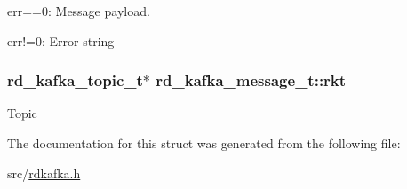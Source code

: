 \begin{DoxyItemize}
\item {\ttfamily err==0}\-: Message payload.
\item {\ttfamily err!=0}\-: Error string 
\end{DoxyItemize}\hypertarget{structrd__kafka__message__t_ad99c2966a73d2a0be7acf101c41d70f1}{
\subsubsection[{rkt}]{\setlength{\rightskip}{0pt plus 5cm}rd\-\_\-kafka\-\_\-topic\-\_\-t$\ast$ rd\-\_\-kafka\-\_\-message\-\_\-t\-::rkt}}\label{structrd__kafka__message__t_ad99c2966a73d2a0be7acf101c41d70f1}
Topic 

The documentation for this struct was generated from the following file\-:\begin{DoxyCompactItemize}
\item 
src/\hyperlink{rdkafka_8h}{rdkafka.\-h}\end{DoxyCompactItemize}
